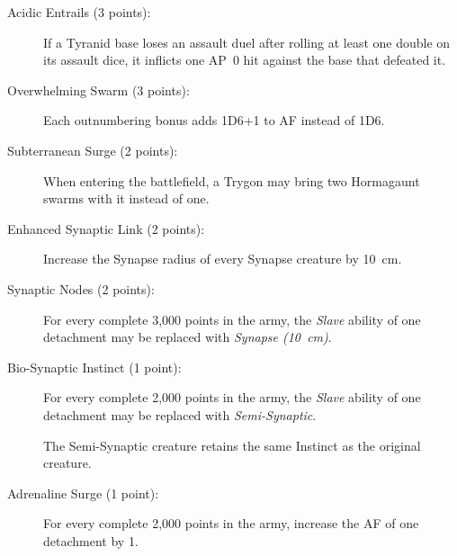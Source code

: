 \begin{description}
    \item[Acidic Entrails (3 points):]
    If a Tyranid base loses an assault duel after rolling at least one double on its assault dice, it inflicts one AP~0 hit against the base that defeated it.

    \item[Overwhelming Swarm (3 points):]
    Each outnumbering bonus adds 1D6+1 to AF instead of 1D6.

    \item[Subterranean Surge (2 points):]
    When entering the battlefield, a Trygon may bring two Hormagaunt swarms with it instead of one.

    \item[Enhanced Synaptic Link (2 points):]
    Increase the Synapse radius of every Synapse creature by 10~cm.

    \item[Synaptic Nodes (2 points):]
    For every complete 3,000 points in the army, the \textit{Slave} ability of one detachment may be replaced with \textit{Synapse (10~cm)}.

    \item[Bio-Synaptic Instinct (1 point):]
    For every complete 2,000 points in the army, the \textit{Slave} ability of one detachment may be replaced with \textit{Semi-Synaptic}.

    The Semi-Synaptic creature retains the same Instinct as the original creature.

    \item[Adrenaline Surge (1 point):]
    For every complete 2,000 points in the army, increase the AF of one detachment by 1.
\end{description}